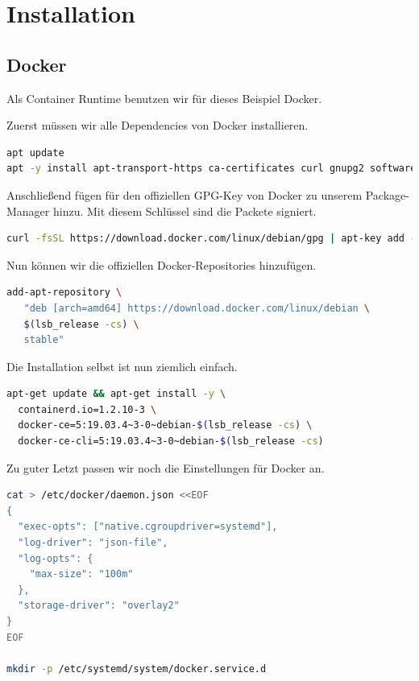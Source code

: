 \hypertarget{installation-1}{%
\newpage
\section{Installation}\label{installation-1}}

\hypertarget{docker}{%
\subsection{Docker}\label{docker}}

Als Container Runtime benutzen wir für dieses Beispiel Docker.

Zuerst müssen wir alle Dependencies von Docker installieren.

\begin{lstlisting}[language=Bash]
apt update
apt -y install apt-transport-https ca-certificates curl gnupg2 software-properties-common
\end{lstlisting}

Anschließend fügen für den offiziellen GPG-Key von Docker zu unserem
Package-Manager hinzu. Mit diesem Schlüssel sind die Packete signiert.

\begin{lstlisting}[language=Bash]
curl -fsSL https://download.docker.com/linux/debian/gpg | apt-key add -
\end{lstlisting}

Nun können wir die offiziellen Docker-Repositories hinzufügen.

\begin{lstlisting}[language=Bash]
add-apt-repository \
   "deb [arch=amd64] https://download.docker.com/linux/debian \
   $(lsb_release -cs) \
   stable"
\end{lstlisting}

Die Installation selbst ist nun ziemlich einfach.

\begin{lstlisting}[language=Bash]
apt-get update && apt-get install -y \
  containerd.io=1.2.10-3 \
  docker-ce=5:19.03.4~3-0~debian-$(lsb_release -cs) \
  docker-ce-cli=5:19.03.4~3-0~debian-$(lsb_release -cs)
\end{lstlisting}

Zu guter Letzt passen wir noch die Einstellungen für Docker an.

\begin{lstlisting}[language=Bash]
cat > /etc/docker/daemon.json <<EOF
{
  "exec-opts": ["native.cgroupdriver=systemd"],
  "log-driver": "json-file",
  "log-opts": {
    "max-size": "100m"
  },
  "storage-driver": "overlay2"
}
EOF

mkdir -p /etc/systemd/system/docker.service.d
\end{lstlisting}

